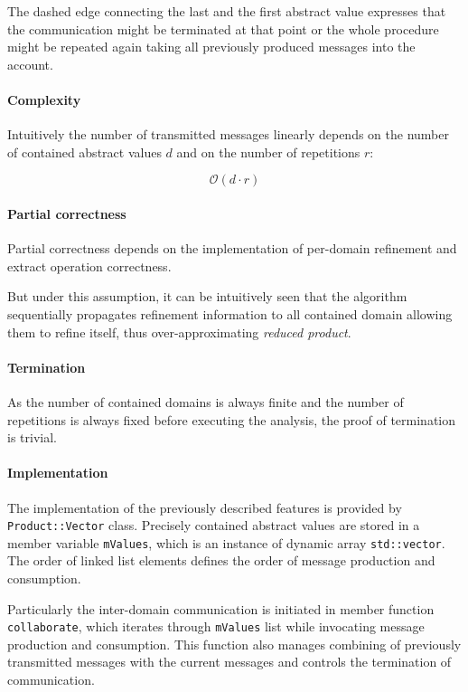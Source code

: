 \documentclass[12pt,oneside]{fithesis2}
\theoremstyle{definition}
\begin{document}
The dashed edge connecting the last and the first abstract value expresses that the communication might be terminated at that point or the whole procedure might be repeated again taking all previously produced messages into the account.

\paragraph{Complexity} Intuitively the number of transmitted messages linearly depends on the number of contained abstract values $d$ and on the number of repetitions $r$:

\[
\mathcal O(d \cdot r)
\]

\paragraph{Partial correctness}
Partial correctness depends on the implementation of per-domain refinement and extract operation correctness.

But under this assumption, it can be intuitively seen that the algorithm sequentially propagates refinement information to all contained domain allowing them to refine itself, thus over-approximating \textit{reduced product}.

\paragraph{Termination}
As the number of contained domains is always finite and the number of repetitions is always fixed before executing the analysis, the proof of termination is trivial.

\paragraph{Implementation} The implementation of the previously described features is provided by \texttt{Product::Vector} class. Precisely contained abstract values are stored in a member variable \texttt{mValues}, which is an instance of  dynamic array \texttt{std::vector}. The order of linked list elements defines the order of message production and consumption.

Particularly the inter-domain communication is initiated in member function \texttt{collaborate}, which iterates through \texttt{mValues} list while invocating message production and consumption. This function also manages combining of previously transmitted messages with the current messages and controls the termination of communication.
\end{document}
